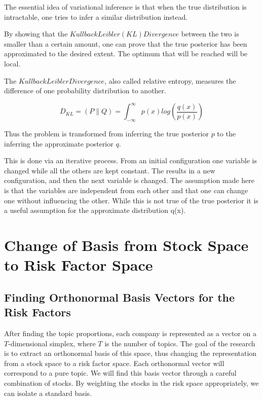 \documentclass[12pt,journal,letterpaper,oneside,onecolumn]{IEEEtran}
\begin{document}
The essential idea of variational inference is that when the true distribution is intractable, one tries to infer a similar distribution instead. 

By showing that the $Kullback Leibler (KL) Divergence$ between the two is smaller than a certain amount, one can prove that the true posterior has been approximated to the desired extent.
The optimum that will be reached will be local.

The $Kullback Leibler Divergence$, also called relative entropy, measures the difference of one probability distribution to another.

\begin{equation}
D_{KL} = (P \parallel Q) = \int_{- \infty}^{\infty} p(x) log \left( \frac{q (x)}{p(x)} \right)
\end{equation}

Thus the problem is transformed from inferring the true posterior $p$ to the inferring the approximate posterior $q$.

This is done via an iterative process.
From an initial configuration one variable is changed while all the others are kept constant. The results in a new configuration, and then the next variable is changed. 
The assumption made here is that the variables are independent from each other and that one can change one without influencing the other. While this is not true of the true posterior it is a useful assumption for the approximate distribution q(x).


\section{Change of Basis from Stock Space to Risk Factor Space }

\subsection{Finding Orthonormal Basis Vectors for the Risk Factors}

After finding the topic proportions, each company is represented as a vector on a $T$-dimensional simplex, where $T$ is the number of topics.
The goal of the research is to extract an orthonormal basis of this space, thus changing the representation from a stock space to a risk factor space.
Each orthonormal vector will correspond to a pure topic.
We will find this basis vector through a careful combination of stocks. By weighting the stocks in the risk space appropriately, we can isolate a standard basis.
\end{document}

